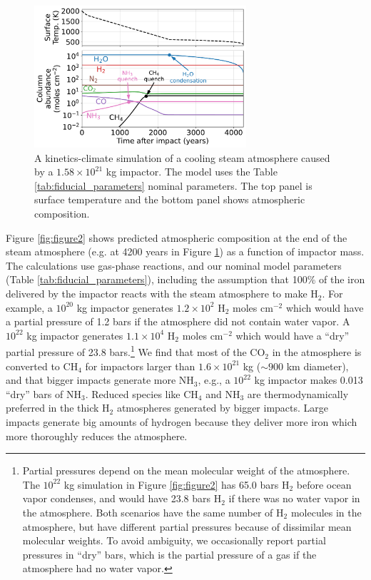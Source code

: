 \begin{figure}
  \centering
  \includegraphics[width=0.7\textwidth]{tex/5impacts/figures/Figure1.pdf}
  \caption{A kinetics-climate simulation of a cooling steam atmosphere caused by a $1.58 \times 10^{21}$ kg impactor. The model uses the Table \ref{tab:fiducial_parameters} nominal parameters. The top panel is surface temperature and the bottom panel shows atmospheric composition.}
  \label{fig:figure1}
\end{figure}

Figure \ref{fig:figure2} shows predicted atmospheric composition at the end of the steam atmosphere (e.g. at 4200 years in Figure \ref{fig:figure1}) as a function of impactor mass. The calculations use gas-phase reactions, and our nominal model parameters (Table \ref{tab:fiducial_parameters}), including the assumption that 100\% of the iron delivered by the impactor reacts with the steam atmosphere to make H$_2$. For example, a $10^{20}$ kg impactor generates $1.2 \times 10^{2}$ H$_2$ moles cm$^{-2}$ which would have a partial pressure of 1.2 bars if the atmosphere did not contain water vapor. A $10^{22}$ kg impactor generates $1.1 \times 10^{4}$ H$_2$ moles cm$^{-2}$ which would have a ``dry'' partial pressure of 23.8 bars.\footnote{Partial pressures depend on the mean molecular weight of the atmosphere. The $10^{22}$ kg simulation in Figure \ref{fig:figure2} has 65.0 bars H$_2$ before ocean vapor condenses, and would have 23.8 bars H$_2$ if there was no water vapor in the atmosphere. Both scenarios have the same number of H$_2$ molecules in the atmosphere, but have different partial pressures because of dissimilar mean molecular weights. To avoid ambiguity, we occasionally report partial pressures in ``dry'' bars, which is the partial pressure of a gas if the atmosphere had no water vapor.}
We find that most of the CO$_2$ in the atmosphere is converted to CH$_4$ for impactors larger than $1.6 \times 10^{21}$ kg ($\sim 900$ km diameter), and that bigger impacts generate more NH$_3$, e.g., a $10^{22}$ kg impactor makes 0.013 ``dry'' bars of NH$_3$. Reduced species like CH$_4$ and NH$_3$ are thermodynamically preferred in the thick H$_2$ atmospheres generated by bigger impacts. Large impacts generate big amounts of hydrogen because they deliver more iron which more thoroughly reduces the atmosphere.

